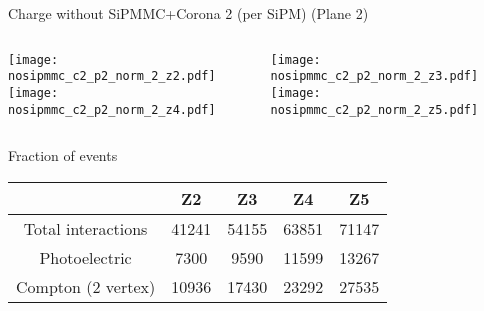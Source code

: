 \documentclass{beamer}
\begin{document}
\begin{frame}{Charge without SiPMMC+Corona 2 (per SiPM) (Plane 2)}
	\begin{columns}[onlytextwidth]
		\begin{column}{0.5\textwidth}
			\texttt{[image: nosipmmc\_c2\_p2\_norm\_2\_z2.pdf]} \\
			\texttt{[image: nosipmmc\_c2\_p2\_norm\_2\_z4.pdf]}
		 \end{column}
		 \begin{column}{0.5\textwidth}
			\texttt{[image: nosipmmc\_c2\_p2\_norm\_2\_z3.pdf]} \\
			\texttt{[image: nosipmmc\_c2\_p2\_norm\_2\_z5.pdf]}
		 \end{column}
 \end{columns}
\end{frame}

\begin{frame}{Fraction of events}
\begin{center}
 \begin{tabular}{c|cccc|}
  \toprule
    & \textbf{Z2} & \textbf{Z3} & \textbf{Z4} & \textbf{Z5} \\
   \hline
  Total interactions & 41241 & 54155 & 63851  & 71147\\
  Photoelectric & 7300 & 9590 & 11599 & 13267\\
  Compton (2 vertex) & 10936 & 17430 & 23292 & 27535 \\ 
  \toprule
 \end{tabular}
\end{center}
\end{frame}

 
\end{document}
